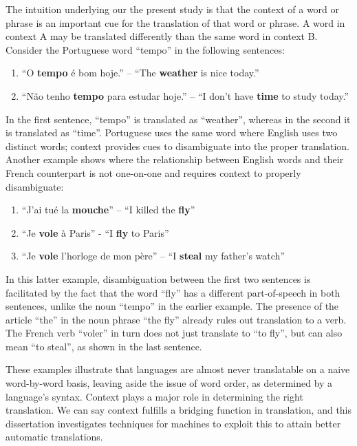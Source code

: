The intuition underlying our the present study is that the context of a word or phrase is an important cue for the
translation of that word or phrase. A word in context A may be translated differently than the same word in context B.
Consider the Portuguese word ``tempo'' in the following sentences:

\begin{enumerate}
\item ``O \textbf{tempo} é bom hoje.'' -- ``The \textbf{weather} is nice today.''
\item ``Não tenho \textbf{tempo} para estudar hoje.'' -- ``I don't have \textbf{time} to study today.''
\end{enumerate}

In the first sentence, ``tempo'' is translated as ``weather'', whereas in the
second it is translated as ``time''. Portuguese uses the same word where
English uses two distinct words; context provides cues to disambiguate into the
proper translation. Another example shows where the relationship between English words and their French counterpart is
not one-on-one and requires context to properly disambiguate:

\begin{enumerate}
\item ``J'ai tué la \textbf{mouche}'' -- ``I killed the \textbf{fly}''
\item ``Je \textbf{vole} à Paris'' - ``I \textbf{fly} to Paris''
\item ``Je \textbf{vole} l'horloge de mon père'' -- ``I \textbf{steal} my father's watch''
\end{enumerate}

In this latter example, disambiguation between the first two sentences is
facilitated by the fact that the word ``fly'' has a different
part-of-speech in both sentences, unlike the noun ``tempo'' in the earlier example.
The presence of the article ``the'' in the noun phrase ``the fly'' already
rules out translation to a verb. The French verb ``voler'' in turn does not
just translate to ``to fly'', but can also mean ``to steal'', as shown in
the last sentence.

These examples illustrate that languages are almost never translatable on a
naive word-by-word basis, leaving aside the issue of word order, as
determined by a language's syntax. Context plays a major role in determining
the right translation. We can say context fulfills a bridging function in
translation, and this dissertation investigates techniques for machines to
exploit this to attain better automatic translations.

